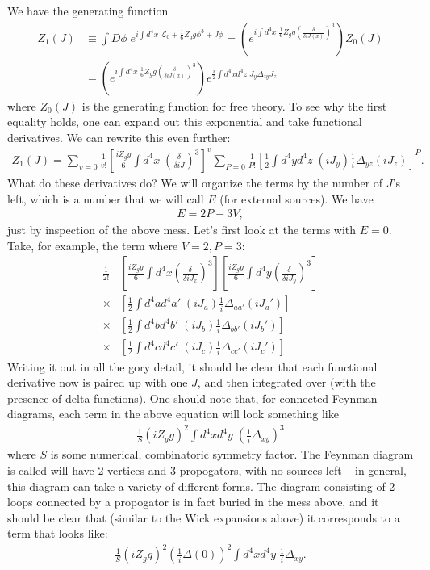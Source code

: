\documentclass{../mathnotes}
\begin{document}
We have the generating function
\begin{align*}
    Z_1(J)&\equiv\int D\phi\;e^{i\int d^4x\; \mathcal{L}_0+\frac{1}{6}Z_gg\phi^3+J\phi}=\left(e^{i\int d^4x\;\frac{1}{6}Z_gg \left(\frac{\delta}{\delta iJ(x)}\right)^3}\right)Z_0(J)\\
    &=\left(e^{i\int d^4x\;\frac{1}{6}Z_gg \left(\frac{\delta}{\delta iJ(x)}\right)^3}\right)e^{\frac{i}{2}\int d^4x d^4z\;J_y\Delta_{zy}J_z}
\end{align*}
where $Z_0(J)$ is the generating function for free theory. To see why the first equality holds, one can expand out this exponential and take functional
derivatives. We can rewrite this even further:
\begin{align*}
    Z_1(J)=\sum_{v=0}\frac{1}{v!}\left[ \frac{iZ_gg}{6}\int d^4x\;\left( \frac{\delta}{\delta iJ} \right)^3 \right]^v\sum_{P=0}\frac{1}{P!}\left[ \frac{1}{2}\int d^4y d^4z\; (iJ_y)\frac{1}{i}\Delta_{yz}(iJ_z)\right]^P.
\end{align*}
What do these derivatives do? We will organize the terms by the number of $J$'s left, which is a number that we will call $E$ (for external sources).
We have
\begin{align*}
    E=2P-3V,
\end{align*}
just by inspection of the above mess. Let's first look at the terms with $E=0$. Take, for example, the term where $V=2,P=3$:
\begin{align*}
    \frac{1}{2!}&\left[ \frac{iZ_gg}{6}\int d^4x\left( \frac{\delta}{\delta iJ_x} \right)^3 \right]\left[ \frac{iZ_gg}{6}\int d^4y\left( \frac{\delta}{\delta iJ_y} \right)^3 \right]\\
    \times &\left[ \frac{1}{2}\int d^4a d^4a'\; (iJ_a)\frac{1}{i}\Delta_{aa'}(iJ_a')\right]\\
    \times &\left[ \frac{1}{2}\int d^4b d^4b'\; (iJ_b)\frac{1}{i}\Delta_{bb'}(iJ_b')\right]\\
    \times &\left[ \frac{1}{2}\int d^4c d^4c'\; (iJ_c)\frac{1}{i}\Delta_{cc'}(iJ_c')\right]
\end{align*}
Writing it out in all the gory detail, it should be clear that each functional derivative now is paired up with one $J$, and then integrated over
(with the presence of delta functions). One should note that, for connected Feynman diagrams, each term in the above equation will look something like
\begin{align*}
    \frac{1}{S}\left( iZ_gg \right)^2\int d^4x d^4y\;\left( \frac{1}{i}\Delta_{xy} \right)^3
\end{align*}
where $S$ is some numerical, combinatoric symmetry factor.
The Feynman diagram is called will have 2 vertices and 3 propogators, with no sources left -- in general, this diagram can take a variety of different forms.
The diagram consisting of 2 loops connected by a propogator is in fact buried in the mess above, and it should be clear that (similar to the Wick expansions above)
it corresponds to a term that looks like:
\begin{align*}
    \frac{1}{S}\left( iZ_gg \right)^2\left( \frac{1}{i}\Delta(0) \right)^2\int d^4x d^4y\;\frac{1}{i}\Delta_{xy}.
\end{align*}
\end{document}
